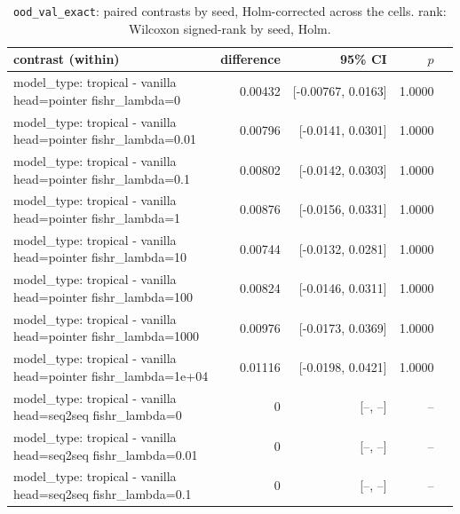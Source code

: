 \documentclass[10pt]{article}
\makeatletter
\newcommand{\stackcell}[1]{\begin{tabular}[t]{@{}l@{}}#1\end{tabular}}
\makeatother
\begin{document}
{\small
\begin{longtable}{lrrrl}
\caption{\texttt{ood\_val\_exact}: paired contrasts by seed, Holm-corrected across the cells. rank: Wilcoxon signed-rank by seed, Holm.}\label{tab:paired-ood_val_exact}\\
\toprule
contrast (within) & difference & 95\% CI & $p$ & \\
\midrule
\endhead
\stackcell{model\_type: tropical - vanilla\\\footnotesize head=pointer fishr\_lambda=0 } & 0.00432 & [-0.00767, 0.0163] & 1.0000 & \\
\stackcell{model\_type: tropical - vanilla\\\footnotesize head=pointer fishr\_lambda=0.01 } & 0.00796 & [-0.0141, 0.0301] & 1.0000 & \\
\stackcell{model\_type: tropical - vanilla\\\footnotesize head=pointer fishr\_lambda=0.1 } & 0.00802 & [-0.0142, 0.0303] & 1.0000 & \\
\stackcell{model\_type: tropical - vanilla\\\footnotesize head=pointer fishr\_lambda=1 } & 0.00876 & [-0.0156, 0.0331] & 1.0000 & \\
\stackcell{model\_type: tropical - vanilla\\\footnotesize head=pointer fishr\_lambda=10 } & 0.00744 & [-0.0132, 0.0281] & 1.0000 & \\
\stackcell{model\_type: tropical - vanilla\\\footnotesize head=pointer fishr\_lambda=100 } & 0.00824 & [-0.0146, 0.0311] & 1.0000 & \\
\stackcell{model\_type: tropical - vanilla\\\footnotesize head=pointer fishr\_lambda=1000 } & 0.00976 & [-0.0173, 0.0369] & 1.0000 & \\
\stackcell{model\_type: tropical - vanilla\\\footnotesize head=pointer fishr\_lambda=1e+04 } & 0.01116 & [-0.0198, 0.0421] & 1.0000 & \\
\stackcell{model\_type: tropical - vanilla\\\footnotesize head=seq2seq fishr\_lambda=0 } & 0 & [--, --] & -- & \\
\stackcell{model\_type: tropical - vanilla\\\footnotesize head=seq2seq fishr\_lambda=0.01 } & 0 & [--, --] & -- & \\
\stackcell{model\_type: tropical - vanilla\\\footnotesize head=seq2seq fishr\_lambda=0.1 } & 0 & [--, --] & -- & \\

\end{longtable}}
\end{document}
